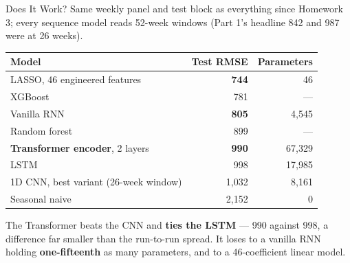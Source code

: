 \documentclass[aspectratio=169, 11pt]{beamer}
\begin{document}
\begin{frame}{Does It Work?}
  Same weekly panel and test block as everything since Homework 3; every sequence model reads
  52-week windows (Part 1's headline 842 and 987 were at 26 weeks).
  \begin{center}
    {\small
    \begin{tabular}{lrr}
      \toprule
      \textbf{Model} & \textbf{Test RMSE} & \textbf{Parameters} \\
      \midrule
      LASSO, 46 engineered features & \textbf{744} & 46 \\
      XGBoost & 781 & --- \\
      Vanilla RNN & \textbf{805} & 4{,}545 \\
      Random forest & 899 & --- \\
      \textbf{Transformer encoder}, 2 layers & \textbf{990} & 67{,}329 \\
      LSTM & 998 & 17{,}985 \\
      1D CNN, best variant (26-week window) & 1{,}032 & 8{,}161 \\
      Seasonal naive & 2{,}152 & 0 \\
      \bottomrule
    \end{tabular}
    }
  \end{center}

  \vspace{-0.05cm}
  The Transformer beats the CNN and \textbf{ties the LSTM} --- 990 against 998, a difference
  far smaller than the run-to-run spread. It loses to a vanilla RNN holding
  \textbf{one-fifteenth} as many parameters, and to a 46-coefficient linear model.
\end{frame}
\end{document}
